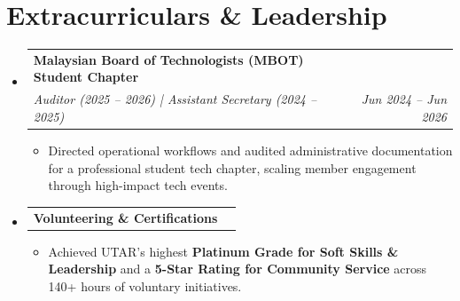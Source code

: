 \documentclass[letterpaper,10pt]{article}
\makeatletter
\newcommand{\resumeItem}[1]{
  \item\small{
    {#1 \vspace{-2pt}}
  }
}
\newcommand{\resumeSubheading}[4]{
  \vspace{-2pt}\item
    \begin{tabular*}{1.0\textwidth}[t]{l@{\extracolsep{\fill}}r}
      \textbf{#1} & #2 \\
      \textit{\small#3} & \textit{\small #4} \\
    \end{tabular*}\vspace{-2pt}
}
\newcommand{\resumeProjectHeading}[2]{
    \item
    \begin{tabular*}{1.0\textwidth}{l@{\extracolsep{\fill}}r}
      \textbf{#1} & #2 \\
    \end{tabular*}\vspace{-7pt}
}
\newcommand{\resumeSubHeadingListStart}{\begin{itemize}[leftmargin=0.0in, label={}]}
\newcommand{\resumeSubHeadingListEnd}{\end{itemize}}
\newcommand{\resumeItemListStart}{\begin{itemize}[leftmargin=0.15in, itemsep=1.5pt, parsep=0pt, topsep=2pt]}
\newcommand{\resumeItemListEnd}{\end{itemize}\vspace{5pt}}
\makeatother
\begin{document}
\section{Extracurriculars \& Leadership}
  \resumeSubHeadingListStart
    \resumeSubheading
      {Malaysian Board of Technologists (MBOT) Student Chapter}{}
      {Auditor (2025 -- 2026) | Assistant Secretary (2024 -- 2025)}{Jun 2024 -- Jun 2026}
      \resumeItemListStart
        \resumeItem{Directed operational workflows and audited administrative documentation for a professional student tech chapter, scaling member engagement through high-impact tech events.}
      \resumeItemListEnd
      
    \resumeProjectHeading
      {\textbf{Volunteering \& Certifications}}{}
      \resumeItemListStart
        \resumeItem{Achieved UTAR's highest \textbf{Platinum Grade for Soft Skills \& Leadership} and a \textbf{5-Star Rating for Community Service} across 140+ hours of voluntary initiatives.}
      \resumeItemListEnd
  \resumeSubHeadingListEnd
\end{document}
